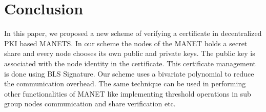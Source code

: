 \documentclass[11pt,a4paper]{llncs}
\begin{document}
%

\section{Conclusion}
In this paper, we proposed a new scheme of verifying a certificate in decentralized PKI based MANETS. In our scheme the nodes of the MANET holds a secret share and every node chooses its own public and private keys. The public key is associated with the node identity in the certificate. This certificate management is done using BLS Signature. Our scheme uses a bivariate polynomial to reduce the communication overhead. The same technique can be used in performing other functionalities of MANET like implementing threshold operations in sub group nodes communication and share verification etc.
 
\end{document}
